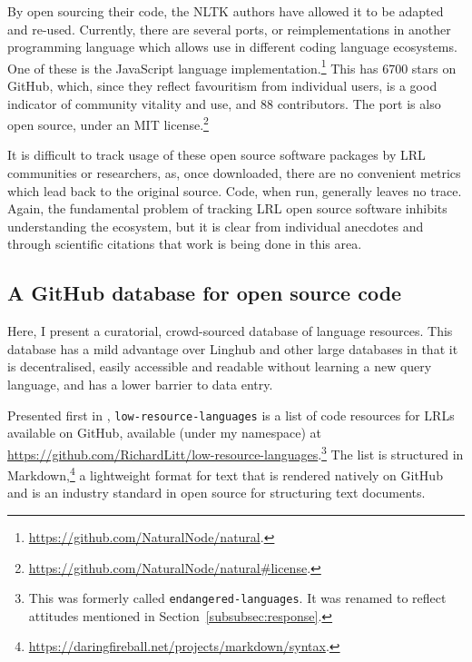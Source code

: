 By open sourcing their code, the NLTK authors have allowed it to be adapted and re-used. Currently, there are several ports, or reimplementations in another programming language which allows use in different coding language ecosystems. One of these is the JavaScript language implementation.\footnote{\href{https://github.com/NaturalNode/natural}{https://github.com/NaturalNode/natural}. } This has 6700 stars on GitHub, which, since they reflect favouritism from individual users, is a good indicator of community vitality and use, and 88 contributors. The port is also open source, under an MIT license.\footnote{\href{https://github.com/NaturalNode/natural\#license}{https://github.com/NaturalNode/natural\#license}. }

It is difficult to track usage of these open source software packages by LRL communities or researchers, as, once downloaded, there are no convenient metrics which lead back to the original source. Code, when run, generally leaves no trace. Again, the fundamental problem of tracking LRL open source software inhibits understanding the ecosystem, but it is clear from individual anecdotes and through scientific citations that work is being done in this area.

\subsection{A GitHub database for open source code}
\label{sec:solutions}

Here, I present a curatorial, crowd-sourced database of language resources. This database has a mild advantage over Linghub and other large databases in that it is decentralised, easily accessible and readable without learning a new query language, and has a lower barrier to data entry.

Presented first in \citet{CCURL}, {\tt low-resource-languages} is a list of code resources for LRLs available on GitHub, available (under my namespace) at \href{https://github.com/RichardLitt/low-resource-languages}{https://github.com/RichardLitt/low-resource-languages}.\footnote{This was formerly called {\tt endangered-languages}. It was renamed to reflect attitudes mentioned in Section~\ref{subsubsec:response}.} The list is structured in Markdown,\footnote{\href{https://daringfireball.net/projects/markdown/syntax}{https://daringfireball.net/projects/markdown/syntax}. } a lightweight format for text that is rendered natively on GitHub and is an industry standard in open source for structuring text documents.


